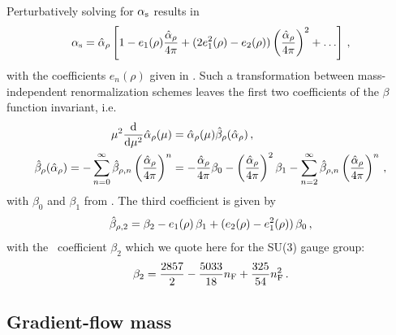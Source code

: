 Perturbatively solving  for $\alpha_\mathrm{s}$ results in
\begin{equation}
  \begin{split}
    \alpha_\mathrm{s} = \hat\alpha_\rho\left[ 1 - e_{1}(\rho)\frac{\hat\alpha_\rho}{4\pi} +
      (2e_{1}^2(\rho)-e_{2}(\rho))\left(\frac{\hat\alpha_\rho}{4\pi}\right)^2 +
      \ldots\right]\,,
  \end{split}
\end{equation}
with the coefficients $e_{n}(\rho)$ given in . Such a
transformation between mass-indepen\-dent renormalization schemes leaves
the first two coefficients of the $\beta$ function invariant, i.e.\
\begin{equation}
  \begin{split}
    \mu^2\dderiv{}{\mu^2}\alphagf(\mu) &= \alphagf(\mu)\betagf{}(\alphagf)\,,\\
    \betagf{}(\alphagf) = -\sum_{n=0}^\infty\betagf{n}
    \left(\frac{\alphagf}{4\pi}\right)^n
    &= - \frac{\alphagf}{4\pi}\beta_0
     - \left(\frac{\alphagf}{4\pi}\right)^2\beta_1
     -\sum_{n=2}^\infty\betagf{n}
     \left(\frac{\alphagf}{4\pi}\right)^n\,,
  \end{split}
\end{equation}
with $\beta_0$ and $\beta_1$ from . The third
coefficient is given by
\begin{equation}
  \begin{split}
    \betagf{2} = \beta_2 - e_{1}(\rho)\,\beta_1 + (e_{2}(\rho)
    - e_{1}^2(\rho))\,\beta_0\,,
  \end{split}
\end{equation}
with the \msbar\ coefficient $\beta_2$ which we quote here for the
SU(3) gauge group:
\begin{equation}
  \begin{split}
    \beta_2 = \frac{2857}{2} - \frac{5033}{18}n_\mathrm{F} + \frac{325}{54}n_\mathrm{F}^2\,.
  \end{split}
\end{equation}

\subsection{Gradient-flow mass}

